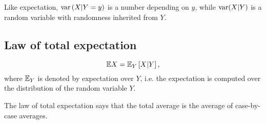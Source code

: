 \begin{note}{}{}
    Like expectation, $\operatorname{var} \left(X | Y =y \right)$ is a number depending on $y$, while $\operatorname{var} (X|Y)$ is a random variable with randomness inherited from $Y$.
\end{note}

\subsection*{Law of total expectation}

\[
    \mathbb{E} X = \mathbb{E}_Y \left[X | Y\right],
\]
where $\mathbb{E}_Y$ is denoted by expectation over $Y$, i.e. the expectation is computed over the distribution of the random variable $Y$.
\begin{note}{}{}
    The law of total expectation says that the total average is the average of case-by-case averages.
\end{note}